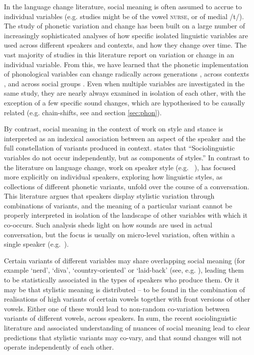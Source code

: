 \documentclass[review]{elsarticle} %
\begin{document}
In the language change literature, social meaning is often assumed to accrue to individual variables (e.g. studies might be of the vowel \textsc{nurse}, or of medial /t/).   The study of phonetic variation and change has been built on a large number of increasingly sophisticated analyses of how specific isolated linguistic variables are used across different speakers and contexts, and how they change over time.   The vast majority of studies in this literature report on variation or change in an individual variable. From this, we have learned that the phonetic implementation of phonological variables can change radically across generations \citep{labov2001principles, trudgill1974social}, across contexts \citep{love2013football, foulkes201513}, and across social groups \citep{eckert2000language, mendoza2014homegirls, dickson2017class}. Even when multiple variables are investigated in the same study, they are nearly always examined in isolation of each other, with the exception of a few specific sound changes, which are hypothesised to be causally related (e.g. chain-shifts, see \citealt{gordon2002investigating, maclagan2007getting, hay2015tracking} and section \ref{sec:phon}).

By contrast, social meaning in the context of work on style and stance is interpreted as an indexical association between an aspect of the speaker and the full constellation of variants produced in context. \cite{eckert2019} states that “Sociolinguistic variables do not occur independently, but as components of styles.”   In contrast to the literature on language change, work on speaker style (e.g. ~\citealt{eckert2016variation, eckert2018meaning}), has focused more explicitly on individual speakers, exploring how linguistic styles, as collections of different phonetic variants, unfold over the course of a conversation. This literature argues that speakers display stylistic variation through combinations of variants, and the meaning of a particular variant cannot be properly interpreted in isolation of the landscape of other variables with which it co-occurs. Such analysis sheds light on how sounds are used in actual conversation, but the focus is usually on micro-level variation, often within a single speaker (e.g.~\citealt{becker2014linguistic,podesva2007phonation}).

Certain variants of different variables may share overlapping social meaning (for example `nerd', `diva', `country-oriented' or `laid-back' (see, e.g. \citealt{bucholtz2010white, podesva2008three, podesva2015country, podesva2011california}), leading them to be statistically associated in the types of speakers who produce them.  Or it may be that stylistic meaning is distributed – to be found in the combination of realisations of high variants of certain vowels together with front versions of other vowels.  Either one of these would lead to non-random co-variation between variants of different vowels, across speakers.  
In sum, the recent sociolinguistic literature and associated understanding of nuances of social meaning lead to clear predictions that stylistic variants may co-vary, and that sound changes will not operate independently of each other.
\end{document}

